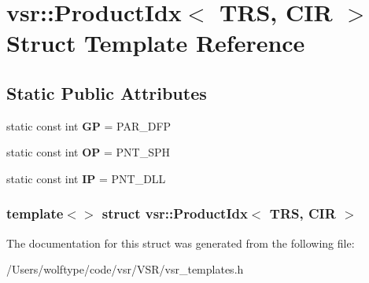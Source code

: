 \hypertarget{structvsr_1_1_product_idx_3_01_t_r_s_00_01_c_i_r_01_4}{\section{vsr\-:\-:Product\-Idx$<$ T\-R\-S, C\-I\-R $>$ Struct Template Reference}
\label{structvsr_1_1_product_idx_3_01_t_r_s_00_01_c_i_r_01_4}
}
\subsection*{Static Public Attributes}
\begin{DoxyCompactItemize}
\item 
\hypertarget{structvsr_1_1_product_idx_3_01_t_r_s_00_01_c_i_r_01_4_ae2d2bb43eb995d1967f13a74094ee9d9}{static const int {\bfseries G\-P} = P\-A\-R\-\_\-\-D\-F\-P}\label{structvsr_1_1_product_idx_3_01_t_r_s_00_01_c_i_r_01_4_ae2d2bb43eb995d1967f13a74094ee9d9}

\item 
\hypertarget{structvsr_1_1_product_idx_3_01_t_r_s_00_01_c_i_r_01_4_a9b0745be0f8136e39bc06e4b072376fc}{static const int {\bfseries O\-P} = P\-N\-T\-\_\-\-S\-P\-H}\label{structvsr_1_1_product_idx_3_01_t_r_s_00_01_c_i_r_01_4_a9b0745be0f8136e39bc06e4b072376fc}

\item 
\hypertarget{structvsr_1_1_product_idx_3_01_t_r_s_00_01_c_i_r_01_4_a74504977f791a0869c345486c7444d1e}{static const int {\bfseries I\-P} = P\-N\-T\-\_\-\-D\-L\-L}\label{structvsr_1_1_product_idx_3_01_t_r_s_00_01_c_i_r_01_4_a74504977f791a0869c345486c7444d1e}

\end{DoxyCompactItemize}
\subsubsection*{template$<$$>$ struct vsr\-::\-Product\-Idx$<$ T\-R\-S, C\-I\-R $>$}



The documentation for this struct was generated from the following file\-:\begin{DoxyCompactItemize}
\item 
/\-Users/wolftype/code/vsr/\-V\-S\-R/vsr\-\_\-templates.\-h\end{DoxyCompactItemize}

